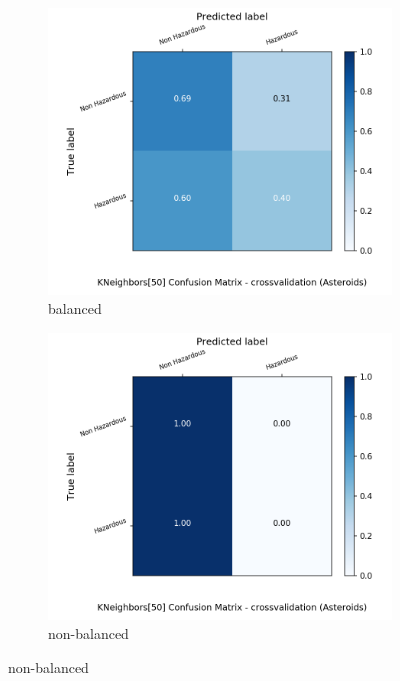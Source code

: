 \begin{figure}[H]
	\centering
	\begin{subfigure}{.5\textwidth}
		\centering
		\includegraphics[width=1.1\textwidth]{Plots/asteroids/asteroids_KNeighbors_50_balance_True_crossvalidation.png}
		\caption{balanced}
	\end{subfigure}%
	\begin{subfigure}{.5\textwidth}
		\centering
		\includegraphics[width=1.1\textwidth]{Plots/asteroids/asteroids_KNeighbors_50_balance_False_crossvalidation.png}
		\caption{non-balanced}
	\end{subfigure}
\end{figure}

